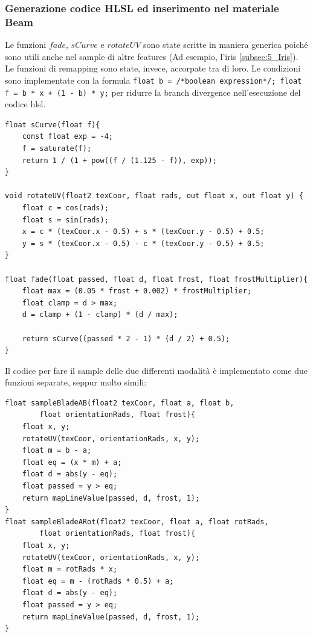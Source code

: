 \documentclass[main.tex]{subfiles}
\begin{document}
\subsubsection{Generazione codice HLSL ed inserimento nel materiale Beam}\label{subsec:5_1_ShaperHlsl}
\lstset{language=glsl}
Le funzioni $fade$, $sCurve$ e $rotateUV$ sono state scritte in maniera generica poiché sono utili anche nel sample di altre features (Ad esempio, l'iris \ref{subsec:5_Iris}). Le funzioni di remapping sono state, invece, accorpate tra di loro. Le condizioni sono implementate con la formula \lstinline{float b = /*boolean expression*/; float f = b * x + (1 - b) * y;} per ridurre la branch divergence nell'esecuzione del codice hlsl.
\begin{lstlisting}
float sCurve(float f){
	const float exp = -4;
	f = saturate(f);
	return 1 / (1 + pow((f / (1.125 - f)), exp));
}

void rotateUV(float2 texCoor, float rads, out float x, out float y) {
	float c = cos(rads);
	float s = sin(rads);
	x = c * (texCoor.x - 0.5) + s * (texCoor.y - 0.5) + 0.5;
	y = s * (texCoor.x - 0.5) - c * (texCoor.y - 0.5) + 0.5;
}

float fade(float passed, float d, float frost, float frostMultiplier){
	float max = (0.05 * frost + 0.002) * frostMultiplier;
	float clamp = d > max;
	d = clamp + (1 - clamp) * (d / max);

	return sCurve((passed * 2 - 1) * (d / 2) + 0.5);
}
\end{lstlisting}

Il codice per fare il sample delle due differenti modalità è implementato come due funzioni separate, seppur molto simili:
\begin{lstlisting}
float sampleBladeAB(float2 texCoor, float a, float b,
		float orientationRads, float frost){
	float x, y;
	rotateUV(texCoor, orientationRads, x, y);
	float m = b - a;
	float eq = (x * m) + a;
	float d = abs(y - eq);
	float passed = y > eq;
	return mapLineValue(passed, d, frost, 1);
}
float sampleBladeARot(float2 texCoor, float a, float rotRads,
		float orientationRads, float frost){
	float x, y;
	rotateUV(texCoor, orientationRads, x, y);
	float m = rotRads * x;
	float eq = m - (rotRads * 0.5) + a;
	float d = abs(y - eq);
	float passed = y > eq;
	return mapLineValue(passed, d, frost, 1);
}
\end{lstlisting}
\end{document}
